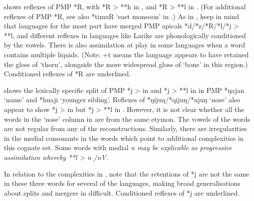  shows reflexes of PMP *R,
with *R > **h in ,
and *R > **l in .
(For additional reflexes of PMP *R,
see also *timuR ‘east monsoon’ in .) As in ,
keep in mind that  languages for the most part
have merged PMP apicals *d/*z/*R/*l/*j > **l,
and different reflexes in languages like Larike are phonologically
conditioned by the vowels.
There is also assimilation at play in some languages when a word contains multiple liquids.
(Note: +t means the language appears to have retained the gloss
of ‘thorn’, alongside the more widespread gloss of ‘bone’ in this region.)
Conditioned reflexes of *R are underlined.

 shows the lexically specific split of PMP *j > {\0}
in  and *j > **l in  in PMP *ŋajan ‘name’
and *huaji ‘younger sibling’.
Reflexes of *ŋijuŋ/*qijuŋ/*ujuŋ ‘nose’ also appear to show *j
> {\0} in  but *j > **l in .
However, it is not clear whether all the words in the ‘nose’
column in  are from the same etymon.
The vowels of the  words are not regular from
any of the reconstructions.
Similarly, there are irregularities in the medial consonants
in the  words which point to additional complexities
in this cognate set.
Some  words with medial \it{n} may be explicable
as progressive assimilation whereby **l > \it{n} /nV{\gap}.

 In relation to the complexities in ,
note that the retentions of *j are not the same in these three
words for several of the languages,
making broad generalisations about splits
and mergers in  difficult.
Conditioned reflexes of *j are underlined.

